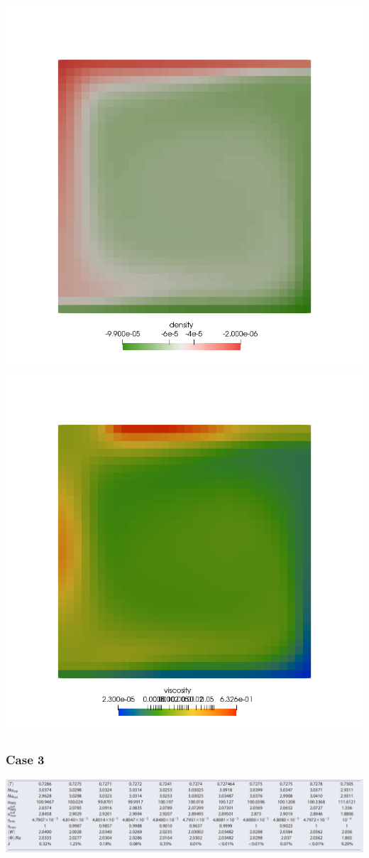 \begin{center}
\includegraphics[width=7.cm]{python_codes/fieldstone_28/results_case2/rho}
\includegraphics[width=7.cm]{python_codes/fieldstone_28/results_case2/mueff}
\end{center}




\newpage %
\subsubsection{Case 3}

\includegraphics[width=16cm]{python_codes/fieldstone_28/results_case3/tosn15}

